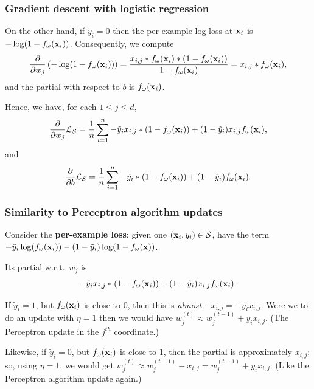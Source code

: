 \documentclass[smaller]{beamer}
\theoremstyle{example}
\begin{document}
\begin{frame}
    \frametitle{Gradient descent with logistic regression}
    On the other hand, if $\tilde y_i = 0$ then the per-example log-loss at ${\bf x}_i$ is $-\log(1-f_{\omega}({\bf x}_i))$. \pause Consequently, we compute 
        \[\frac{\partial}{\partial w_j}\left( -\log(1-f_{\omega}({\bf x}_i)) \right) = \frac{x_{i,j}\ast f_{\omega}({\bf x}_i)\ast(1 - f_{\omega}({\bf x}_i))}{1-f_{\omega}({\bf x}_i)} = x_{i,j}\ast f_{\omega}({\bf x}_i),\]
and the partial with respect to $b$ is $f_{\omega}({\bf x}_i)$.

\pause
Hence, we have, for each $1\le j\le d$,
    \[\frac{\partial}{\partial w_j}\mathcal L_{\mathcal S} = \frac1n\sum_{i=1}^n -\tilde y_ix_{i,j}\ast(1-f_{\omega}({\bf x}_i)) + (1-\tilde y_i)x_{i,j}f_{\omega}({\bf x}_i),\]
and 
    \[\frac{\partial}{\partial b}\mathcal L_{\mathcal S} = \frac1n\sum_{i=1}^n -\tilde y_i\ast(1-f_{\omega}({\bf x}_i)) + (1-\tilde y_i)f_{\omega}({\bf x}_i).\]
\end{frame}

\begin{frame}
    \frametitle{Similarity to Perceptron algorithm updates}
    Consider the \textbf{per-example loss}: given one $({\bf x}_i, y_i) \in\mathcal S$, have the term $-\tilde y_i\log(f_{\omega}({\bf x}_i)) - (1 - \tilde y_i)\log(1 - f_{\omega}({\bf x}))$.

    Its partial w.r.t.\ $w_j$ is 
        \[-\tilde y_ix_{i,j}\ast(1-f_{\omega}({\bf x}_i)) + (1-\tilde y_i)x_{i,j}f_{\omega}({\bf x}_i).\]

    \pause
    If $\tilde y_i=1$, but $f_{\omega}({\bf x}_i)$ is close to 0, then this is \textit{almost} $-x_{i,j} = -y_i x_{i,j}$. Were we to do an update with $\eta=1$ then we would have $w_j^{(t)} \approx w_j^{(t-1)} + y_i x_{i,j}$. (The Perceptron update in the $j^{th}$ coordinate.)

    \pause
    Likewise, if $\tilde y_i=0$, but $f_{\omega}({\bf x}_i)$ is close to $1$, then the partial is approximately $x_{i,j}$; so, using $\eta=1$, we would get $w_j^{(t)} \approx w_j^{(t-1)} - x_{i,j} = w_j^{(t-1)} + y_ix_{i,j}$. (Like the Perceptron algorithm update again.)
\end{frame}
\end{document}
